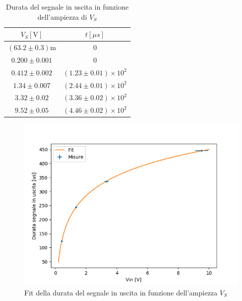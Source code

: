 \documentclass{article}
\begin{document}
		\begin{table}[h]
			\begin{center}
				\begin{tabular}{cc}
					\hline
					$V_S [\mathrm{V}]$&$t[\mu s]$ \\
					\hline
					$(63.2\pm0.3) \mathrm{m}$ & $0$ \\
					$0.200\pm0.001$ & $0$ \\
					$0.412\pm0.002$ & $(1.23\pm0.01)\times 10^{2}$ \\
					$1.34\pm0.007$ & $(2.44\pm0.01)\times 10^{2}$ \\
					$3.32\pm0.02$ & $(3.36\pm0.02)\times 10^{2}$ \\
					$9.52\pm0.05$ & 	$(4.46\pm0.02)\times 10^{2}$ \\
					\hline
				\end{tabular}
			\end{center}
			\caption{Durata del segnale in uscita in funzione dell'ampiezza di $V_S$}
			\label{tab:durata}
		\end{table}
		
		\begin{figure}
			\centering
			\includegraphics[width=\linewidth]{immagini/1c.png}
			\caption{Fit della durata del segnale in uscita in funzione dell'ampiezza $V_S$}
			\label{fit:1c}
		\end{figure}
		
\end{document}
